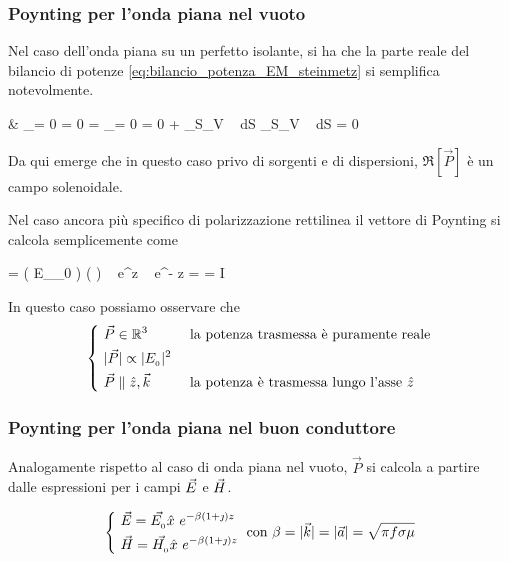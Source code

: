 	\subsubsection{Poynting per l'onda piana nel vuoto}

		Nel caso dell'onda piana su un perfetto isolante, si ha che la parte reale del bilancio di potenze \eqref{eq:bilancio_potenza_EM_steinmetz} si semplifica notevolmente.

		\begin{esp} \label{eq:bilancio_potenza_EM_steinmetz}
			& _{= 0  \jt = 0}
				= _{= 0  \sigma = 0}
				+ \int_{S_V} \Re[\vec{P}] \cdot {} ~ dS
				\implies \int_{S_V} \Re[\vec{P}] \cdot {} ~ dS = 0
		\end{esp}

		Da qui emerge che in questo caso privo di sorgenti e di dispersioni, $\Re[\vec{P}]$ è un campo solenoidale.

		Nel caso ancora più specifico di polarizzazione rettilinea il vettore di Poynting si calcola semplicemente come
		\begin{esp}
				=  \left( E_{_{0}}  \right) \times \left(   \right)
					~ e^{\jmath \beta z} ~ e^{- \jmath \beta z}
				= \frac{|E_{_{0}}|^2}{2\eta} \hat{z}
				= I \hat{z}
		\end{esp}

		In questo caso possiamo osservare che
		\begin{equation}
			\begin{dcases}
				~ \vec{P} \in \mathbb{R}^3 & \text{ la potenza trasmessa è puramente reale} \\
				~ |\vec{P}| \propto |E_{_{0}}|^2 \\
				~ \vec{P} \parallel \hat{z}, \vec{k} & \text{ la potenza è trasmessa lungo l'asse } \hat{z}
			\end{dcases}
		\end{equation}

	\subsubsection{Poynting per l'onda piana nel buon conduttore}
		Analogamente rispetto al caso di onda piana nel vuoto, $\vec{P}$ si calcola a partire dalle espressioni per i campi $\vec{E}$ e $\vec{H}$.

		\begin{equation}
			\begin{dcases}
				~ \vec{E} = \vec{E_{_{0}}} \hat{x} ~ e^{-\beta(1+\jmath) z} \\
				~ \vec{H} = \vec{H_{_{0}}} \hat{x} ~ e^{-\beta(1+\jmath) z} \\
			\end{dcases}
			\text{ con } \beta = |\vec{k}| = |\vec{a}| = \sqrt{\pi f \sigma \mu}
		\end{equation}


